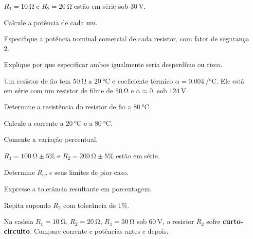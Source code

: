 \blocoaprofundamento
\begin{questao}[3]{}

$R_1=\SI{10}{\ohm}$ e $R_2=\SI{20}{\ohm}$ estão em série sob
$\SI{30}{\volt}$.
\begin{itensq}
\item Calcule a potência de cada um.
\item Especifique a potência nominal comercial de cada resistor, com fator de
      segurança $2$.
\item Explique por que especificar ambos igualmente seria desperdício ou risco.
\end{itensq}


\end{questao}
\begin{questao}[3]{}

Um resistor de fio tem $\SI{50}{\ohm}$ a $\SI{20}{\celsius}$ e coeficiente
térmico $\alpha=\SI{0.004}{\per\celsius}$. Ele está em série com um resistor de
filme de $\SI{50}{\ohm}$ e $\alpha\approx0$, sob $\SI{124}{\volt}$.
\begin{itensq}
\item Determine a resistência do resistor de fio a $\SI{80}{\celsius}$.
\item Calcule a corrente a $\SI{20}{\celsius}$ e a $\SI{80}{\celsius}$.
\item Comente a variação percentual.
\end{itensq}


\end{questao}
\begin{questao}[3]{}

$R_1=\SI{100}{\ohm}\pm5\%$ e $R_2=\SI{200}{\ohm}\pm5\%$ estão em série.
\begin{itensq}
\item Determine $R_{eq}$ e seus limites de pior caso.
\item Expresse a tolerância resultante em porcentagem.
\item Repita supondo $R_2$ com tolerância de $1\%$.
\end{itensq}


\end{questao}
\begin{questao}[3]{}

Na cadeia $R_1=\SI{10}{\ohm}$, $R_2=\SI{20}{\ohm}$, $R_3=\SI{30}{\ohm}$ sob
$\SI{60}{\volt}$, o resistor $R_2$ sofre \textbf{curto-circuito}. Compare
corrente e potências antes e depois.


\end{questao}

